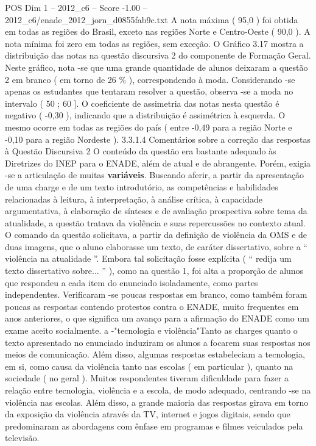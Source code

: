 \begin{textsample}{POS Dim 1 – 2012\_c6 – Score -1.00 – 2012\_c6/enade\_2012\_jorn\_d0855fab9c.txt}
A nota máxima ( 95,0 ) foi obtida em todas as regiões do Brasil, exceto nas regiões Norte e Centro-Oeste ( 90,0 ).
A nota mínima foi zero em todas as regiões, sem exceção.
O Gráfico 3.17 mostra a distribuição das notas na questão discursiva 2 do componente de Formação Geral.
Neste gráfico, nota -se que uma grande quantidade de alunos deixaram a questão 2 em branco ( em torno de 26 \% ), correspondendo à moda.
Considerando -se apenas os estudantes que tentaram resolver a questão, observa -se a moda no intervalo ( 50 ; 60 ].
O coeficiente de assimetria das notas nesta questão é negativo ( -0,30 ), indicando que a distribuição é assimétrica à esquerda.
O mesmo ocorre em todas as regiões do país ( entre -0,49 para a região Norte e -0,10 para a região Nordeste ). 3.3.1.4 Comentários sobre a correção das respostas à Questão Discursiva 2 O conteúdo da questão era bastante adequado às Diretrizes do INEP para o ENADE, além de atual e de abrangente.
Porém, exigia -se a articulação de muitas \textbf{variáveis}.
Buscando aferir, a partir da apresentação de uma charge e de um texto introdutório, as competências e habilidades relacionadas à leitura, à interpretação, à análise crítica, à capacidade argumentativa, à elaboração de sínteses e de avaliação prospectiva sobre tema da atualidade, a questão tratava da violência e suas repercussões no contexto atual.
O comando da questão solicitava, a partir da definição de violência da OMS e de duas imagens, que o aluno elaborasse um texto, de caráter dissertativo, sobre a “ violência na atualidade ”.
Embora tal solicitação fosse explícita ( “ redija um texto dissertativo sobre... ” ), como na questão 1, foi alta a proporção de alunos que respondeu a cada item do enunciado isoladamente, como partes independentes.
Verificaram -se poucas respostas em branco, como também foram poucas as respostas contendo protestos contra o ENADE, muito frequentes em anos anteriores, o que significa um avanço para a afirmação do ENADE como um exame aceito socialmente. a -"tecnologia e violência"Tanto as charges quanto o texto apresentado no enunciado induziram os alunos a focarem suas respostas nos meios de comunicação.
Além disso, algumas respostas estabeleciam a tecnologia, em si, como causa da violência tanto nas escolas ( em particular ), quanto na sociedade ( no geral ).
Muitos respondentes tiveram dificuldade para fazer a relação entre tecnologia, violência e a escola, de modo adequado, centrando -se na violência nas escolas.
Além disso, a grande maioria das respostas girava em torno da exposição da violência através da TV, internet e jogos digitais, sendo que predominaram as abordagens com ênfase em programas e filmes veiculados pela televisão.

\end{textsample}

